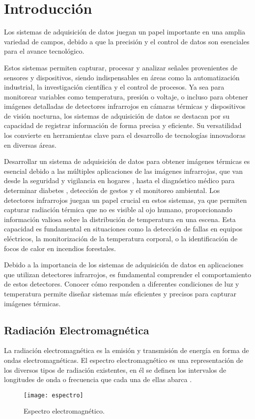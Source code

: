 \chapter{Introducción}
Los sistemas de adquisición de datos juegan un papel importante en una amplia variedad de campos, debido a que la precisión y el control de datos son esenciales para el avance tecnológico.

Estos sistemas permiten capturar, procesar y analizar señales provenientes de sensores y dispositivos, siendo indispensables en áreas como la automatización industrial, la investigación científica y el control de procesos. Ya sea para monitorear variables como temperatura, presión o voltaje, o incluso para obtener imágenes detalladas de detectores infrarrojos en cámaras térmicas y dispositivos de visión nocturna, los sistemas de adquisición de datos se destacan por su capacidad de registrar información de forma precisa y eficiente. Su versatilidad los convierte en herramientas clave para el desarrollo de tecnologías innovadoras en diversas áreas.


Desarrollar un sistema de adquisición de datos para obtener imágenes térmicas es esencial debido a las múltiples aplicaciones de las imágenes infrarrojas, que van desde la seguridad y vigilancia en hogares \cite{Yii2023}, hasta el diagnóstico médico para determinar diabetes \cite{LeneroBardallo2022}, detección de gestos \cite{LeBa2019} y el monitoreo ambiental. Los detectores infrarrojos juegan un papel crucial en estos sistemas, ya que permiten capturar radiación térmica que no es visible al ojo humano, proporcionando información valiosa sobre la distribución de temperatura en una escena. Esta capacidad es fundamental en situaciones como la detección de fallas en equipos eléctricos, la monitorización de la temperatura corporal, o la identificación de focos de calor en incendios forestales. 


Debido a la importancia de los sistemas de adquisición de datos en aplicaciones que utilizan detectores infrarrojos, es fundamental comprender el comportamiento de estos detectores. Conocer cómo responden a diferentes condiciones de luz y temperatura permite diseñar sistemas más eficientes y precisos para capturar imágenes térmicas.
    
    \section{Radiación Electromagnética}
    La radiación electromagnética es la emisión y transmisión de energía en forma de ondas electromagnéticas. El espectro electromagnético es una representación de los diversos tipos de radiación existentes, en él se definen los intervalos de longitudes de onda o frecuencia que cada una de ellas abarca \cite{Chang}.
            \begin{figure}[hbtp]
                \centering
                \texttt{[image: espectro]}
                \caption{Espectro electromagnético.}
                \label{fig:espectro}
            \end{figure}    
    
